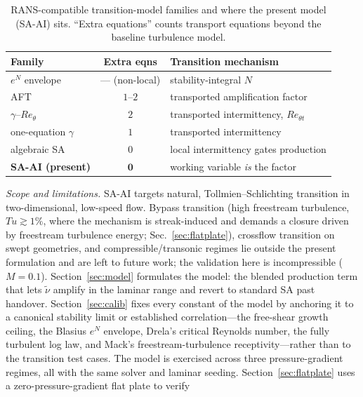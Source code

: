 \documentclass[journal]{new-aiaa}
\begin{document}
\begin{table}[t]
  \centering
  \caption{RANS-compatible transition-model families and where the present model
  (SA-AI) sits. ``Extra equations'' counts transport equations beyond the baseline
  turbulence model.}
  \label{tab:taxonomy}
  \begin{tabular}{lcl}
    \toprule
    Family & Extra eqns & Transition mechanism \\
    \midrule
    $e^N$ envelope \cite{smith_gamberoni_1956, drela_giles_1987} & --- (non-local) & stability-integral $N$ \\
    AFT \cite{coder_maughmer_2014, halila_2022} & $1$--$2$ & transported amplification factor \\
    $\gamma$--$Re_\theta$ \cite{langtry_menter_2009, medida_baeder_2011} & $2$ & transported intermittency, $Re_{\theta t}$ \\
    one-equation $\gamma$ \cite{menter_gamma_2015} & $1$ & transported intermittency \\
    algebraic SA \cite{cakmakcioglu_2018, rahman_2024} & $0$ & local intermittency gates production \\
    \textbf{SA-AI (present)} & $\mathbf{0}$ & working variable \emph{is} the factor \\
    \bottomrule
  \end{tabular}
\end{table}
\emph{Scope and limitations.} SA-AI targets natural, Tollmien--Schlichting
transition in two-dimensional, low-speed flow. Bypass transition (high freestream
turbulence, $Tu\!\gtrsim\!1\%$, where the mechanism is streak-induced and demands a
closure driven by freestream turbulence energy; Sec.~\ref{sec:flatplate}),
crossflow transition on swept geometries, and compressible/transonic regimes lie
outside the present formulation and are left to future work; the validation here is
incompressible ($M\!=\!0.1$).
Section~\ref{sec:model} formulates the model: the blended production term that
lets $\tilde\nu$ amplify in the laminar range and revert to standard SA past
handover. Section~\ref{sec:calib} fixes every constant of the model by anchoring
it to a canonical stability limit or established correlation---the free-shear
growth ceiling, the Blasius $e^N$ envelope, Drela's critical Reynolds number,
the fully turbulent log law, and
Mack's freestream-turbulence receptivity---rather than to the transition test
cases.
The model is exercised across three pressure-gradient regimes, all with the same
solver and laminar seeding.
Section~\ref{sec:flatplate} uses a zero-pressure-gradient flat plate to verify
\end{document}
